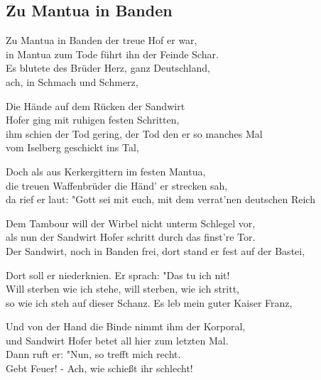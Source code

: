 
\subsection*{Zu Mantua in Banden}
%
%

\thestrophe Zu Mantua in Banden der treue Hof er war, \\
in Mantua zum Tode führt ihn der Feinde Schar. \\
Es blutete des Brüder Herz, ganz Deutschland, \\
ach, in Schmach und Schmerz, 

\thestrophe Die Hände auf dem Rücken der Sandwirt \\
Hofer ging mit ruhigen festen Schritten, \\
ihm schien der Tod gering, der Tod den er so manches Mal \\
vom Iselberg geschickt ins Tal,  

\thestrophe Doch als aus Kerkergittern im festen Mantua, \\
die treuen Waffenbrüder die Händ' er strecken sah, \\
da rief er laut: "Gott sei mit euch, mit dem verrat'nen deutschen Reich \\

\thestrophe Dem Tambour will der Wirbel nicht unterm Schlegel vor, \\
als nun der Sandwirt Hofer schritt durch das finst're Tor. \\
Der Sandwirt, noch in Banden frei, dort stand er fest auf der Bastei, \\

\thestrophe Dort soll er niederknien. Er sprach: "Das tu ich nit! \\
Will sterben wie ich stehe, will sterben, wie ich stritt, \\
so wie ich steh auf dieser Schanz. Es leb mein guter Kaiser Franz, \\

\thestrophe Und von der Hand die Binde nimmt ihm der Korporal, \\
und Sandwirt Hofer betet all hier zum letzten Mal. \\
Dann ruft er: "Nun, so trefft mich recht. \\
Gebt Feuer! - Ach, wie schießt ihr schlecht! 